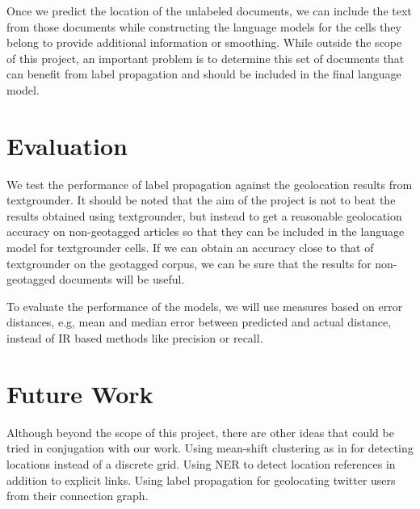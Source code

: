 \documentclass[11pt]{article}
\begin{document}
Once we predict the location of the unlabeled documents, we can include the text from those documents
while constructing the language models for the cells they belong to provide additional information or smoothing.
While outside the scope of this project, an important problem is to determine this set of documents 
that can benefit from label propagation and should be included in the final language model.

\section{Evaluation}
We test the performance of label propagation against the geolocation results from textgrounder. 
It should be noted that the aim of the project is not to beat the results obtained using textgrounder,
but instead to get a reasonable geolocation accuracy on non-geotagged articles 
so that they can be included in the language model for textgrounder cells. 
If we can obtain an accuracy close to that of textgrounder on the geotagged corpus, 
we can be sure that the results for non-geotagged documents will be useful.


To evaluate the performance of the models, we will use measures based on error distances, 
e.g, mean and median error between predicted and actual distance,  
instead of IR based methods like precision or recall.

\section{Future Work}
Although beyond the scope of this project, there are other ideas that could be tried in conjugation with our work.
Using mean-shift clustering as in \cite{Grauman} for detecting locations instead of a discrete grid.
Using NER to detect location references in addition to explicit links.
Using label propagation for geolocating twitter users from their connection graph.




\end{document}
